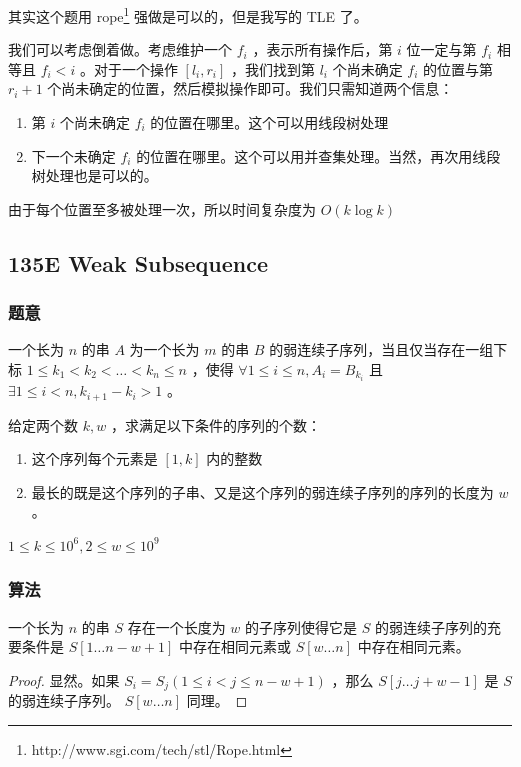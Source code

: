 \documentclass[11pt]{article}
\begin{document}
    其实这个题用 rope\footnote{http://www.sgi.com/tech/stl/Rope.html
 } 强做是可以的，但是我写的 TLE 了。

    我们可以考虑倒着做。考虑维护一个 $f_i$ ，表示所有操作后，第 $i$ 位一定与第 $f_i$ 相等且 $f_i < i$ 。对于一个操作 $[l_i, r_i]$ ，我们找到第 $l_i$ 个尚未确定 $f_i$ 的位置与第 $r_i + 1$ 个尚未确定的位置，然后模拟操作即可。我们只需知道两个信息：
\begin{enumerate}
\item 第 $i$ 个尚未确定 $f_i$ 的位置在哪里。这个可以用线段树处理
\item 下一个未确定 $f_i$ 的位置在哪里。这个可以用并查集处理。当然，再次用线段树处理也是可以的。
\end{enumerate}

    由于每个位置至多被处理一次，所以时间复杂度为 $O(k \log k)$ 
\subsection{135E  Weak Subsequence}
\label{sec-9-8}
\subsubsection{题意}
\label{sec-9-8-1}

\begin{definition}
  一个长为 $n$ 的串 $A$ 为一个长为 $m$ 的串 $B$ 的弱连续子序列，当且仅当存在一组下标 $1 \leq k_1 < k_2 < \dots < k_n \leq n$ ，使得 $\forall 1 \leq i \leq n, A_i = B_{k_i}$ 且 $\exists 1 \leq i < n, k_{i + 1} - k_i > 1$ 。
\end{definition}

    给定两个数 $k, w$ ，求满足以下条件的序列的个数：
\begin{enumerate}
\item 这个序列每个元素是 $[1, k]$ 内的整数
\item 最长的既是这个序列的子串、又是这个序列的弱连续子序列的序列的长度为 $w$ 。
\end{enumerate}

    $1 \leq k \leq 10^6, 2 \leq w \leq 10^9$
\subsubsection{算法}
\label{sec-9-8-2}

\begin{theorem}
  一个长为 $n$ 的串 $S$ 存在一个长度为 $w$ 的子序列使得它是 $S$ 的弱连续子序列的充要条件是 $S[1 \dots n - w + 1]$ 中存在相同元素或 $S[w \dots n]$ 中存在相同元素。
\end{theorem}
\begin{proof}
  显然。如果 $S_i = S_j (1 \leq i < j \leq n - w + 1)$ ，那么 $S[j \dots j + w - 1]$ 是 $S$ 的弱连续子序列。 $S[w \dots n]$ 同理。
\end{proof}
\end{document}
